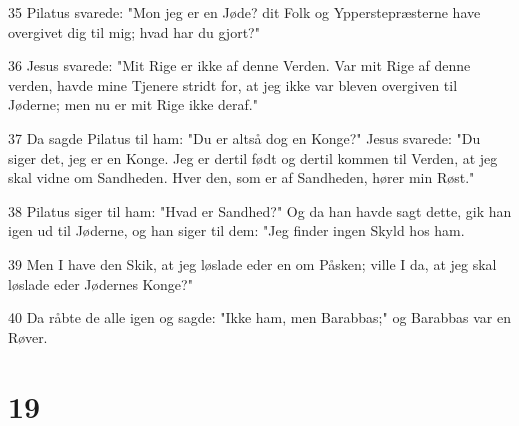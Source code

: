 \par 35 Pilatus svarede: "Mon jeg er en Jøde? dit Folk og Ypperstepræsterne have overgivet dig til mig; hvad har du gjort?"
\par 36 Jesus svarede: "Mit Rige er ikke af denne Verden. Var mit Rige af denne verden, havde mine Tjenere stridt for, at jeg ikke var bleven overgiven til Jøderne; men nu er mit Rige ikke deraf."
\par 37 Da sagde Pilatus til ham: "Du er altså dog en Konge?" Jesus svarede: "Du siger det, jeg er en Konge. Jeg er dertil født og dertil kommen til Verden, at jeg skal vidne om Sandheden. Hver den, som er af Sandheden, hører min Røst."
\par 38 Pilatus siger til ham: "Hvad er Sandhed?" Og da han havde sagt dette, gik han igen ud til Jøderne, og han siger til dem: "Jeg finder ingen Skyld hos ham.
\par 39 Men I have den Skik, at jeg løslade eder en om Påsken; ville I da, at jeg skal løslade eder Jødernes Konge?"
\par 40 Da råbte de alle igen og sagde: "Ikke ham, men Barabbas;" og Barabbas var en Røver.

\chapter{19}

